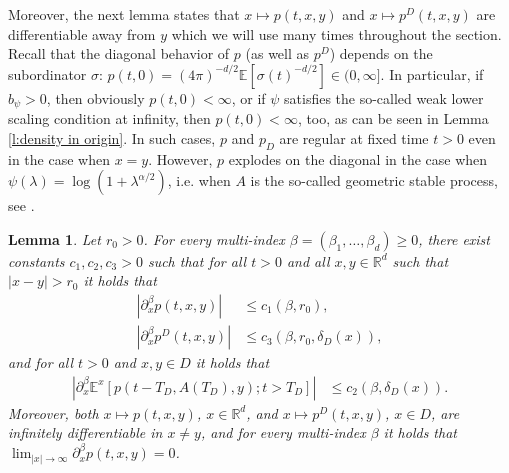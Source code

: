 \documentclass[reqno]{amsart}
\newtheorem{lemma}[theorem]{Lemma}
\theoremstyle{remark}
\numberwithin{equation}{section} %
\newcommand{\de}{\delta_D}
\newcommand{\1}{\mathds{1}}
\begin{document}
	Moreover, the next lemma states that $x\mapsto p(t,x,y)$ and $x\mapsto p^D(t,x,y)$ are differentiable away from $y$ which we will use many times throughout the section. Recall that the diagonal behavior of $p$ (as well as $p^D$) depends on the subordinator $\sigma$: $p(t,0)=(4\pi)^{-d/2}\mathds{E}[\sigma(t)^{-d/2}]\in(0,\infty]$. In particular, if $b_\psi>0$, then obviously $p(t,0)<\infty$, or if $\psi$ satisfies the so-called weak lower scaling condition at infinity, then  $p(t,0)<\infty$, too, as can be seen in Lemma \ref{l:density in origin}. In such cases, $p$ and $p_D$ are regular at fixed time $t>0$ even in the case when $x=y$. However, $p$ explodes on the diagonal in the case when $\psi(\lambda)=\log(1+\lambda^{\alpha/2})$, i.e. when $A$ is the so-called geometric stable process, see \cite[Theorem 2.6]{SSV06-pot_th_gsp}. 
	\begin{lemma}\label{l:differ of dens SBM SBKM}
		Let $r_0>0$. For every multi-index $\beta=(\beta_1,\dots,\beta_d)\ge0$, there exist constants $c_1,c_2,c_3>0$ such that for all $t>0$ and all $x,y\in \mathbb{R}^d$ such that $|x-y|>r_0$ it holds that
		\begin{align}
			|\partial^\beta_x p(t,x,y)|&\le c_1(\beta, r_0),\label{eq:differ of dens SBM}\\
			|\partial^\beta_x p^D(t,x,y)|&\le c_3(\beta, r_0,\de(x)),\label{eq:differ of dens SBKM}
		\end{align}
		and for all $t>0$ and $x,y\in D$ it holds that
		\begin{align}
			|\partial^\beta_x \mathds{E}^x\left[p(t-T_D,A({T_D}),y);t>T_D\right]|&\le c_2(\beta, \de(x)). \label{eq:differ of dens SBKM-2}
		\end{align}
		Moreover, both $x\mapsto p(t,x,y)$, $x\in \mathbb{R}^d$, and $x\mapsto p^D(t,x,y)$, $x\in D$, are infinitely differentiable in $x\ne y$, and for every multi-index $\beta$ it holds that $\lim_{|x|\to\infty}\partial^\beta_x p(t,x,y)=0$.
	\end{lemma}
\end{document}

